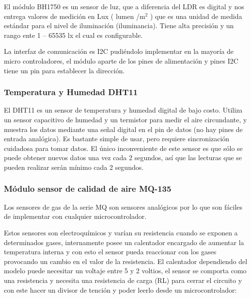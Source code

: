 El módulo BH1750 es un sensor de luz, que a diferencia del LDR es digital y nos entrega valores de medición en Lux ( lumen /m$^2$ ) que es una  unidad de medida estándar para el nivel de iluminación (iluminancia). Tiene alta precisión y un rango ente 1 – 65535 lx el cual es configurable.

La interfaz de comunicación es I2C pudiéndolo implementar en la mayoría de micro controladores, el módulo aparte de los pines de alimentación y pines I2C tiene un pin para establecer la dirección.


\subsubsection{Temperatura y Humedad DHT11}

El DHT11 es un sensor de temperatura y humedad digital de bajo costo. Utiliza un sensor capacitivo de humedad y un termistor para medir el aire circundante, y muestra los datos mediante una señal digital en el pin de datos (no hay pines de entrada analógica). Es bastante simple de usar, pero requiere sincronización cuidadosa para tomar datos. El único inconveniente de este sensor es que sólo se puede obtener nuevos datos una vez cada 2 segundos, así que las lecturas que se pueden realizar serán mínimo cada 2 segundos.


\subsubsection{Módulo sensor de calidad de aire MQ-135}

Los sensores de gas de la serie MQ son sensores analógicos por lo que son fáciles de implementar con cualquier microcontrolador.

Estos sensores son electroquímicos y varían su resistencia cuando se exponen a determinados gases, internamente posee un calentador encargado de aumentar la temperatura interna y con esto el sensor pueda reaccionar con los gases provocando un cambio en el valor de la resistencia. El calentador dependiendo del modelo puede necesitar un voltaje entre 5 y 2 voltios, el sensor se comporta como una resistencia y necesita una resistencia de carga (RL) para cerrar el circuito y con este hacer un divisor de tención y poder leerlo desde un microcontrolador:

